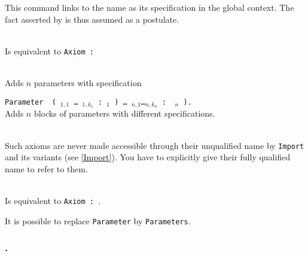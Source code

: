 \subsubsection{
\label{Axiom}}

This command links {\term} to the name {\ident} as its specification
in the global context. The fact asserted by {\term} is thus assumed as
a postulate.

\begin{ErrMsgs}
\item {}
\end{ErrMsgs}

\begin{Variants} 
\item {}
  {} \\
  Is equivalent to {\tt Axiom {\ident} : {\term}}

\item {}\\
  Adds $n$ parameters with specification {\term}

\item
 {\tt Parameter\,%
(\,{\ident$_{1,1}$} {\ldots} {\ident$_{1,k_1}$}\,{\tt :}\,{\term$_1$} {\tt )}\;%
\ldots\;{\tt (}\,{\ident$_{n,1}$}{\ldots}{\ident$_{n,k_n}$}\,{\tt :}\,%
{\term$_n$} {\tt )}.}\\ 
  Adds $n$ blocks of parameters with different specifications.

\item {}\\
  Such axioms are never made accessible through their unqualified name by
  {\tt Import} and its variants (see \ref{Import}). You have to explicitly
  give their fully qualified name to refer to them.

\item {}
  {}\\
  Is equivalent to {\tt Axiom {\ident} : {\term}}.
\end{Variants}

 It is possible to replace {\tt Parameter} by
{\tt Parameters}.


\subsubsection{.
\label{Variable}}


